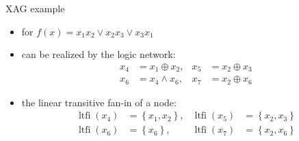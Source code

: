   \begin{frame}{XAG example}
    \begin{itemize}
      \item for $f(x)=x_1x_2\vee x_2x_3\vee x_3x_1$
      \item can be realized by the logic network: 
      \begin{align}
        x_{4} & = x_{1} \oplus x_{2}, & x_{5} & = x_{2} \oplus x_{3} \\
        x_{6} & = x_{4} \wedge x_{6}, & x_{7} & = x_{2} \oplus x_{6}
      \end{align}
      \item the linear transitive fan-in of a node:
      \begin{align}
        \operatorname{ltfi}\left(x_{4}\right) & = \left\{x_{1}, x_{2}\right\} 
        ,&\operatorname{ltfi}\left(x_{5}\right) & = \left\{x_{2}, x_{3}\right\} \\
        \operatorname{ltfi}\left(x_{6}\right) & = \left\{x_{6}\right\} 
        ,&\operatorname{ltfi}\left(x_{7}\right) & = \left\{x_{2}, x_{6}\right\} 
      \end{align}
    \end{itemize}
  \end{frame}
  
